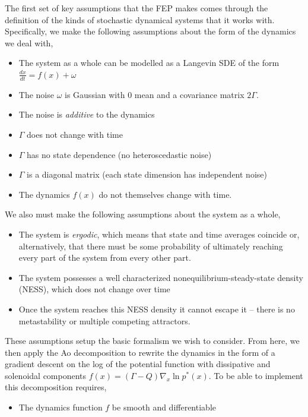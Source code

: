 The first set of key assumptions that the FEP makes comes through the definition of the kinds of stochastic dynamical systems that it works with. Specifically, we make the following assumptions about the form of the dynamics we deal with,
\begin{itemize}
  \item The system as a whole can be modelled as a Langevin SDE of the form $\frac{dx}{dt} = f(x) + \omega$
  \item The noise $\omega$ is Gaussian with 0 mean and a covariance matrix $2\Gamma$.
  \item The noise is \emph{additive} to the dynamics
  \item $\Gamma$ does not change with time
  \item $\Gamma$ has no state dependence (no heteroscedastic noise)
  \item $\Gamma$ is a diagonal matrix (each state dimension has independent noise)
  \item The dynamics $f(x)$ do not themselves change with time.
\end{itemize}
We also must make the following assumptions about the system as a whole,
\begin{itemize}
  \item The system is \emph{ergodic}, which means that state and time averages coincide or, alternatively, that there must be some probability of ultimately reaching every part of the system from every other part.
  \item The system possesses a well characterized nonequilibrium-steady-state density (NESS), which does not change over time
  \item Once the system reaches this NESS density it cannot escape it -- there is no metastability or multiple competing attractors.
\end{itemize}
These assumptions setup the basic formalism we wish to consider. From here, we then apply the Ao decomposition to rewrite the dynamics in the form of a gradient descent on the log of the potential function with dissipative and solenoidal components $f(x)= (\Gamma - Q)\nabla_x \ln p^*(x)$. To be able to implement this decomposition requires,
\begin{itemize}
  \item The dynamics function $f$ be smooth and differentiable
\end{itemize}


